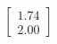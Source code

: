 \documentclass[preview]{standalone}
\begin{document}
\begin{align*}
\begin{bmatrix} 1.74 \\ 2.00 \end{bmatrix}
\end{align*}
\end{document}
